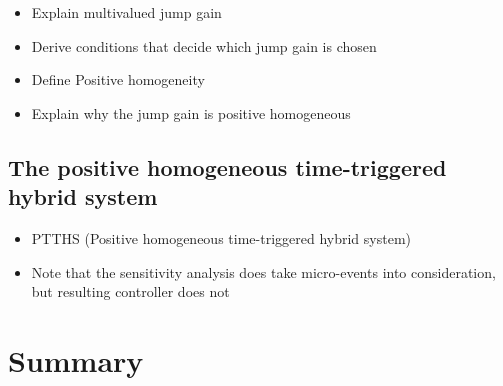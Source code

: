 \documentclass[../DC2017114Bouma.tex]{subfiles}
\begin{document}
\begin{itemize}
\item Explain multivalued jump gain
\item Derive conditions that decide which jump gain is chosen
\item Define Positive homogeneity
\item Explain why the jump gain is positive homogeneous
\end{itemize}
\subsection{The positive homogeneous time-triggered hybrid system}




\begin{itemize}
\item PTTHS (Positive homogeneous time-triggered hybrid system)
\item Note that the sensitivity analysis does take micro-events into consideration, but resulting controller does not
\end{itemize}
%
%
%
%
%
%

\section{Summary}
\end{document}
